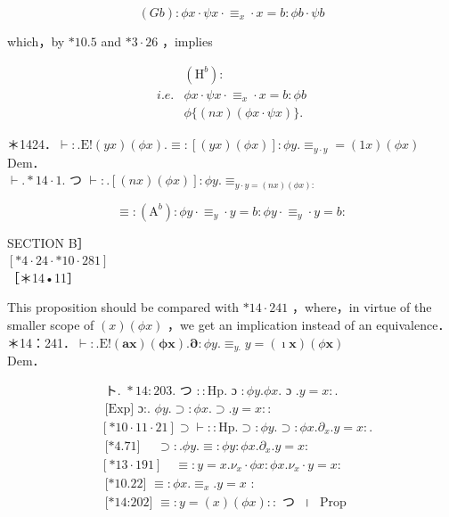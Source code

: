 \documentclass[10pt]{article}
\begin{document}
$$
(G b): \phi x \cdot \psi x \cdot \equiv_{x} \cdot x=b: \phi b \cdot \psi b
$$

which，by $* 10.5$ and $* 3 \cdot 26$ ，implies

$$
\begin{array}{lc} 
& \left(\mathrm{H}^{b}\right): \\
i . e . & \phi x \cdot \psi x \cdot \equiv_{x} \cdot x=b: \phi b \\
& \phi\{(n x)(\phi x \cdot \psi x)\} .
\end{array}
$$

＊1424．$\vdash: . \mathrm{E}!(y x)(\phi x) . \equiv:[(y x)(\phi x)]: \phi y . \equiv_{y \cdot y}=(1 x)(\phi x)$\\
Dem．\\
$\vdash . * 14 \cdot 1$. つ $\vdash: .[(n x)(\phi x)]: \phi y . \equiv_{y \cdot y=(n x)(\phi x):}$

$$
\equiv:\left(\mathrm{A}^{b}\right): \phi y \cdot \equiv_{y} \cdot y=b: \phi y \cdot \equiv_{y} \cdot y=b:
$$

SECTION B］\\
$[* 4 \cdot 24 \cdot * 10 \cdot 281]$\\
［＊14•11］

This proposition should be compared with $* 14 \cdot 241$ ，where，in virtue of the smaller scope of $(x)(\phi x)$ ，we get an implication instead of an equivalence．\\
＊14：241．$\vdash: . \mathrm{E}!(\boldsymbol{a} \boldsymbol{x})(\boldsymbol{\phi} \boldsymbol{x}) . \boldsymbol{\partial}: \phi y . \equiv_{y .} y=(\boldsymbol{\imath} \boldsymbol{x})(\phi \boldsymbol{x})$\\
Dem．

$$
\begin{aligned}
& \text { ト. } * 14: 203 . \text { つ }:: \mathrm{Hp} . \text { ɔ }: \phi y . \phi x . \text { ɔ } . y=x: . \\
& \text { [Exp] ɔ:. } \phi y . \supset: \phi x . \supset . y=x:: \\
& {[* 10 \cdot 11 \cdot 21] \supset \vdash:: \mathrm{Hp} . \supset: \phi y . \supset: \phi x . \partial_{x} . y=x: .} \\
& \text { [*4.71] } \quad \supset: . \phi y . \equiv: \phi y: \phi x . \partial_{x} . y=x: \\
& {[* 13 \cdot 191] \quad \equiv: y=x . \nu_{x} \cdot \phi x: \phi x . \nu_{x} \cdot y=x:} \\
& \text { [*10.22] } \equiv: \phi x . \equiv_{x} . y=x \text { : } \\
& \text { [*14:202] } \equiv: y=(x)(\phi x):: \text { つ } \text { । } \text { Prop }
\end{aligned}
$$
\end{document}
